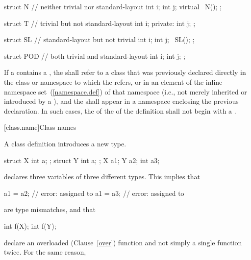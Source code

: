 \enterexample
\begin{codeblock}
struct N {          // neither trivial nor standard-layout
  int i;
  int j;
  virtual ~N();
};

struct T {          // trivial but not standard-layout
  int i;
private: 
  int j;
};

struct SL {         // standard-layout but not trivial
  int i;
  int j;
  ~SL();
};

struct POD {        // both trivial and standard-layout
  int i;
  int j;
};
\end{codeblock}
\exitexample

\pnum
If a  contains a ,
the  shall refer to a class that was
previously declared directly in the class or namespace to which the
 refers,
or in an element of the inline namespace set~(\ref{namespace.def}) of that namespace
(i.e., not merely inherited or
introduced by a ), and the
 shall appear in a namespace enclosing the
previous declaration.
In such cases, the  of the
 of the
definition shall not begin with a .

[class.name]{Class names}
%
%
%

\pnum
A class definition introduces a new type.
\enterexample

\begin{codeblock}
struct X { int a; };
struct Y { int a; };
X a1;
Y a2;
int a3;
\end{codeblock}

declares three variables of three different types. This implies that

\begin{codeblock}
a1 = a2;                        // error:  assigned to 
a1 = a3;                        // error:  assigned to 
\end{codeblock}

are type mismatches, and that

\begin{codeblock}
int f(X);
int f(Y);
\end{codeblock}

%
declare an overloaded (Clause~\ref{over}) function  and not
simply a single function  twice. For the same reason,

